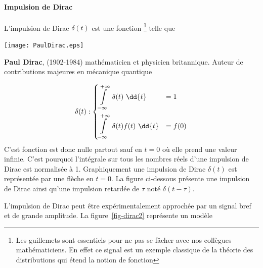 \paragraph{Impulsion de Dirac}
L'impulsion de Dirac
$\delta(t)$ est une \og fonction\fg 
\footnote{Les guillemets sont essentiels pour ne pas se fâcher avec 
nos collègues mathématiciens. En effet ce signal est un exemple classique de la 
théorie des distributions qui étend la notion de fonction} telle que
\begin{marginfigure}[0.5em]
    \centering
    \texttt{[image: PaulDirac.eps]} 
    \caption*{\textbf{Paul Dirac}, (1902-1984) 
              mathématicien et physicien britannique. Auteur de 
              contributions majeures en mécanique quantique} 
\end{marginfigure}
\begin{align*}
    \delta(t) : 
    \begin{dcases}
    	\int\limits_{-\infty}^{+\infty}	 \delta(t)\,\,\dd{t}&=1   \\
        \int\limits_{-\infty}^{+\infty}  \delta(t)f(t)\,\,\dd{t}&=f(0)	
    \end{dcases}
\end{align*}
C'est fonction est donc nulle partout sauf en $t=0$ où elle prend 
une valeur infinie. C'est pourquoi l'intégrale sur tous les nombres réels 
d'une impulsion de Dirac est normalisée à 1.
Graphiquement une impulsion de Dirac $\delta(t)$ est 
représentée par une flèche en $t=0$. La figure ci-dessous présente 
une impulsion de Dirac ainsi qu'une 
impulsion retardée de $\tau$ noté $\delta(t-\tau)$.
\begin{figure}[!h]
    \centering
    
\end{figure}
L'impulsion de Dirac peut être expérimentalement approchée par un signal 
bref et de grande amplitude. La figure~\ref{fig-dirac2} représente un modèle 
